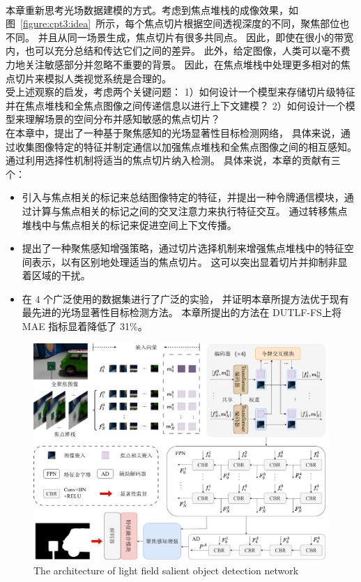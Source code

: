 \\
%
%
%
%
\indent 
本章重新思考光场数据建模的方式。考虑到焦点堆栈的成像效果，如图~\ref{figure:cpt3:idea}~所示，每个焦点切片根据空间透视深度的不同，聚焦部位也不同。 并且从同一场景生成，焦点切片有很多共同点。
因此，即使在很小的带宽内，也可以充分总结和传达它们之间的差异。 此外，给定图像，人类可以毫不费力地关注敏感部分并忽略不重要的背景。 因此，在焦点堆栈中处理更多相对的焦点切片来模拟人类视觉系统是合理的。 
\\
%
%
%
%
\indent
受上述观察的启发，考虑两个关键问题：
1）如何设计一个模型来存储切片级特征并在焦点堆栈和全焦点图像之间传递信息以进行上下文建模？ 
2）如何设计一个模型来理解场景的空间分布并感知敏感的焦点切片？ 
\\
%
%
%
%
\indent
在本章中，提出了一种基于聚焦感知的光场显著性目标检测网络，
具体来说，通过收集图像特定的特征并制定通信以加强焦点堆栈和全焦点图像之间的相互感知。 
通过利用选择性机制将适当的焦点切片纳入检测。 
具体来说，本章的贡献有三个：
\begin{itemize}
	\item 引入与焦点相关的标记来总结图像特定的特征，并提出一种令牌通信模块，通过计算与焦点相关的标记之间的交叉注意力来执行特征交互。 通过转移焦点堆栈中与焦点相关的标记来促进空间上下文传播。 
	\item 提出了一种聚焦感知增强策略，通过切片选择机制来增强焦点堆栈中的特征空间表示，以有区别地处理适当的焦点切片。	这可以突出显着切片并抑制非显着区域的干扰。 
	\item 在 4 个广泛使用的数据集进行了广泛的实验，
	并证明本章所提方法优于现有最先进的光场显著性目标检测方法。 本章所提出的方法在 DUTLF-FS上将 MAE 指标显着降低了 31\%。
\end{itemize}
%
%
\begin{figure}[!ht]
	\centering
	\includegraphics[width=1.\linewidth]{figures/chapter3/overview_1}
	{The architecture of light field salient object detection network}  
	\label{cpt3_fig1:overview}
\end{figure}
